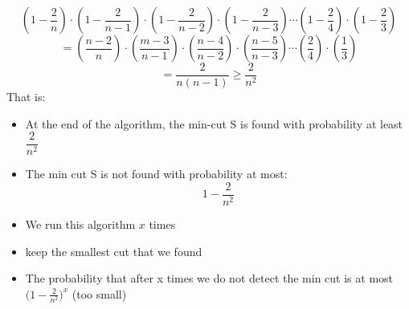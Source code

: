 \documentclass{article}[18pt]
\begin{document}
$$\left( 1 - \frac { 2 } { n } \right) \cdot \left( 1 - \frac { 2 } { n - 1 } \right) \cdot \left( 1 - \frac { 2 } { n - 2 } \right) \cdot \left( 1 - \frac { 2 } { n - 3 } \right) \cdots \left( 1 - \frac { 2 } { 4 } \right) \cdot \left( 1 - \frac { 2 } { 3 } \right)$$
$$= \left( \frac { n - 2 } { n } \right) \cdot \left( \frac { m - 3 } { n - 1 } \right) \cdot \left( \frac { n - 4 } { n - 2 } \right) \cdot \left( \frac { n - 5 } { n - 3 } \right) \cdots \left( \frac { 2 } { 4 } \right) \cdot \left( \frac { 1 } { 3 } \right)$$
$$= \frac { 2 } { n ( n - 1 ) } \geq \frac { 2 } { n ^ { 2 } }$$
That is:
\begin{itemize}
	\item At the end of the algorithm, the min-cut S is found with probability at least $\dfrac{2}{n^2}$
	\item The min cut S is not found with probability at most:
	$$1-\dfrac{2}{n^2}$$
	\item We run this algorithm $x$ times
	\item keep the smallest cut that we found
	\item The probability that after x times we do not detect the min cut is at most $\big(1-\frac{2}{n^2}\big)^x$ (too small)
\end{itemize}
\end{document}
